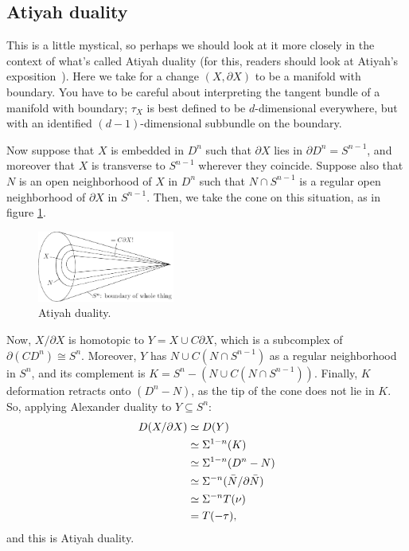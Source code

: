 \subsection*{Atiyah duality}
This is a little mystical, so perhaps we should look at it more closely in the context of what's called Atiyah duality (for this, readers should look at Atiyah's exposition~\cite{Atiyah}).  Here we take for a change $(X, \partial X)$ to be a manifold with boundary.  You have to be careful about interpreting the tangent bundle of a manifold with boundary; $\tau_X$ is best defined to be $d$-dimensional everywhere, but with an identified $(d-1)$-dimensional subbundle on the boundary.  %

Now suppose that $X$ is embedded in $D^n$ such that $\partial X$ lies in $\partial D^n=S^{n-1}$, and moreover that $X$ is transverse to $S^{n-1}$ wherever they coincide. Suppose also that $N$ is an open neighborhood of $X$ in $D^n$ such that $N\cap S^{n-1}$ is a regular open neighborhood of $\partial X$ in $S^{n-1}$. Then, we take the cone on this situation, as in figure \ref{AtiyahDuality}.
\begin{figure}[ht!]
\centering\includegraphics[width=0.4\textwidth]{figures/figure29.pdf}
\caption{\small Atiyah duality.}\label{AtiyahDuality}
\end{figure}

Now, $X / \partial X$ is homotopic to  $Y = X \cup C \partial X$, which is a subcomplex of $\partial(CD^n)\cong S^n$.  Moreover, $Y$ has $N \cup C(N \cap S^{n-1})$ as a regular neighborhood in $S^n$, and its complement is $K=S^n - (N \cup C(N \cap S^{n-1}))$.  Finally, $K$ deformation retracts onto $(D^n-N)$, as the tip of the cone does not lie in $K$. So, applying Alexander duality to $Y\subseteq S^n$:
\begin{align*}
D(X / \partial X) & \simeq D(Y) \\
& \simeq \Sigma^{1-n}(K) \\
& \simeq \Sigma^{1-n}(D^n - N) \\
& \simeq \Sigma^{-n}(\bar N / \partial \bar N) \\
& \simeq \Sigma^{-n} T (\nu)\\
& = T(-\tau),
\end{align*}
and this is Atiyah duality.

